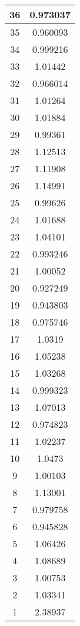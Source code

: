 \begin{table}[h]
\begin{subtable}[h]{2in}
{\begin{tabular}{|c|c|}
36   &   0.973037  \\  \hline  
35   &   0.960093  \\  \hline  
34   &   0.999216  \\  \hline  
33   &   1.01442  \\  \hline  
32   &   0.966014  \\  \hline  
31   &   1.01264  \\  \hline  
30   &   1.01884  \\  \hline  
29   &   0.99361  \\  \hline  
28   &   1.12513  \\  \hline  
27   &   1.11908  \\  \hline  
26   &   1.14991  \\  \hline  
25   &   0.99626  \\  \hline  
24   &   1.01688  \\  \hline  
23   &   1.04101  \\  \hline  
22   &   0.993246  \\  \hline  
21   &   1.00052  \\  \hline  
20   &   0.927249  \\  \hline  
19   &   0.943803  \\  \hline  
18   &   0.975746  \\  \hline  
17   &   1.0319  \\  \hline  
16   &   1.05238  \\  \hline  
15   &   1.03268  \\  \hline  
14   &   0.999323  \\  \hline  
13   &   1.07013  \\  \hline  
12   &   0.974823  \\  \hline  
11   &   1.02237  \\  \hline  
10   &   1.0473  \\  \hline  
9   &   1.00103  \\  \hline  
8   &   1.13001  \\  \hline  
7   &   0.979758  \\  \hline  
6   &   0.945828  \\  \hline  
5   &   1.06426  \\  \hline  
4   &   1.08689  \\  \hline  
3   &   1.00753  \\  \hline  
2   &   1.03341  \\  \hline  
1   &   2.38937  \\  \hline   
        \end{tabular}
}
\end{subtable}
\end{table}
